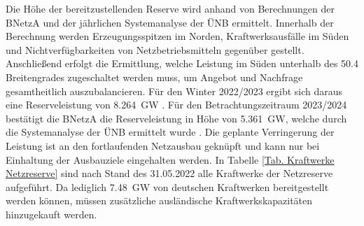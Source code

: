 			Die Höhe der bereitzustellenden Reserve wird anhand von Berechnungen der BNetzA und der jährlichen Systemanalyse der ÜNB ermittelt.
			Innerhalb der Berechnung werden Erzeugungsspitzen im Norden, Kraftwerksausfälle im Süden und Nichtverfügbarkeiten von Netzbetriebsmitteln gegenüber gestellt.
			Anschließend erfolgt die Ermittlung, welche Leistung im Süden unterhalb des \num{50,4} Breitengrades zugeschaltet werden muss, um Angebot und Nachfrage gesamtheitlich auszubalancieren.
			Für den Winter 2022/2023 ergibt sich daraus eine Reserveleistung von \SI{8,264}{\giga\watt} \cite{Bedarf_Netz_Kapa_Reserve}.
			Für den Betrachtungszeitraum 2023/2024 bestätigt die BNetzA die Reserveleistung in Höhe von \SI{5,361}{\giga\watt}, welche durch die Systemanalyse der ÜNB ermittelt wurde \cite{Bedarf_Netz_Kapa_Reserve}.		
			Die geplante Verringerung der Leistung ist an den fortlaufenden Netzausbau geknüpft und kann nur bei Einhaltung der Ausbauziele eingehalten werden. 
			In Tabelle \ref{Tab. Kraftwerke Netzreserve} sind nach Stand des 31.05.2022 alle Kraftwerke der Netzreserve aufgeführt. 
			Da lediglich \SI{7,48}{\giga\watt} von deutschen Kraftwerken bereitgestellt werden können, müssen zusätzliche ausländische Kraftwerkskapazitäten hinzugekauft werden. 
			
